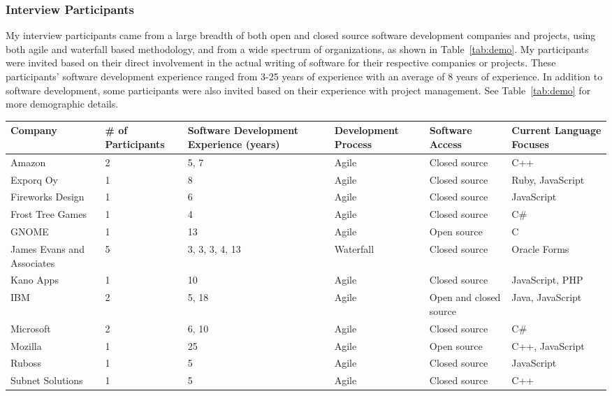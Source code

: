 \subsubsection{Interview Participants}

My interview participants came from a large breadth of both open and closed source software development companies
and projects, using both  agile and waterfall based methodology, and from a wide spectrum of organizations, as shown in Table~\ref{tab:demo}.
My participants were invited based on their direct involvement in the actual writing of software for
their respective companies or projects. These participants' software development experience ranged from 3-25 years of experience
with an average of 8 years of experience.
In addition to software development, some participants were also invited based on their experience with project management. 
See Table~\ref{tab:demo} for more demographic details.

\begin{table*}[tb!]
\begin{center}
\begin{tabular}{| p{2cm} | p{2cm} | p{2cm} | p{2cm} | p{2cm} | p{2cm} |}
\hline
Company & \# of Participants & Software Development Experience (years) & Development Process & Software Access & Current Language Focuses \\
\hline
\hline
Amazon & 2 & 5, 7 & Agile & Closed source & C++ \\ \hline
Exporq Oy & 1 & 8 & Agile & Closed source & Ruby, JavaScript \\ \hline
Fireworks Design & 1 & 6 & Agile & Closed source & JavaScript \\ \hline
Frost Tree Games & 1 & 4 & Agile & Closed source & C\# \\ \hline
GNOME & 1 & 13 & Agile & Open source & C \\ \hline
James Evans and Associates & 5 & 3, 3, 3, 4, 13 & Waterfall & Closed source & Oracle Forms \\ \hline
Kano Apps & 1 & 10 & Agile & Closed source & JavaScript, PHP \\ \hline
IBM & 2 & 5, 18 & Agile & Open and closed source & Java, JavaScript \\ \hline
Microsoft & 2 & 6, 10 & Agile & Closed source & C\# \\ \hline
Mozilla & 1 & 25 & Agile & Open source & C++, JavaScript \\ \hline
Ruboss & 1 & 5 & Agile & Closed source & JavaScript \\ \hline 
Subnet Solutions & 1 & 5 & Agile & Closed source & C++ \\ \hline
\end{tabular}
\end{center}
\caption{Demographic information of interview participants.\label{tab:demo}}
\end{table*}

